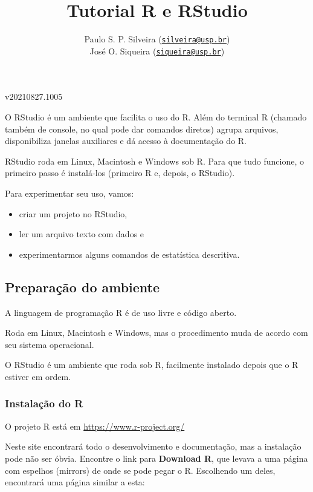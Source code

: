 \documentclass[
]{article}
\title{Tutorial R e RStudio}
\author{Paulo S. P. Silveira
(\href{mailto:silveira@usp.br}{\nolinkurl{silveira@usp.br}})\\
José O. Siqueira
(\href{mailto:siqueira@usp.br}{\nolinkurl{siqueira@usp.br}})}
\date{}
\providecommand{\tightlist}{%
  \setlength{\itemsep}{0pt}\setlength{\parskip}{0pt}}
\begin{document}
\maketitle

{
\setcounter{tocdepth}{4}
\tableofcontents
}
v20210827.1005

O RStudio é um ambiente que facilita o uso do R. Além do terminal R
(chamado também de console, no qual pode dar comandos diretos) agrupa
arquivos, disponibiliza janelas auxiliares e dá acesso à documentação do
R.

RStudio roda em Linux, Macintosh e Windows sob R. Para que tudo
funcione, o primeiro passo é instalá-los (primeiro R e, depois, o
RStudio).

Para experimentar seu uso, vamos:

\begin{itemize}
\tightlist
\item
  criar um projeto no RStudio,
\item
  ler um arquivo texto com dados e
\item
  experimentarmos alguns comandos de estatística descritiva.
\end{itemize}

\hypertarget{preparauxe7uxe3o-do-ambiente}{%
\subsection{Preparação do ambiente}\label{preparauxe7uxe3o-do-ambiente}}

A linguagem de programação R é de uso livre e código aberto.

Roda em Linux, Macintosh e Windows, mas o procedimento muda de acordo
com seu sistema operacional.

O RStudio é um ambiente que roda sob R, facilmente instalado depois que
o R estiver em ordem.

\hypertarget{instalauxe7uxe3o-do-r}{%
\subsubsection{Instalação do R}\label{instalauxe7uxe3o-do-r}}

O projeto R está em \url{https://www.r-project.org/}

Neste site encontrará todo o desenvolvimento e documentação, mas a
instalação pode não ser óbvia. Encontre o link para \textbf{Download R},
que levava a uma página com espelhos (mirrors) de onde se pode pegar o
R. Escolhendo um deles, encontrará uma página similar a esta:
\end{document}
